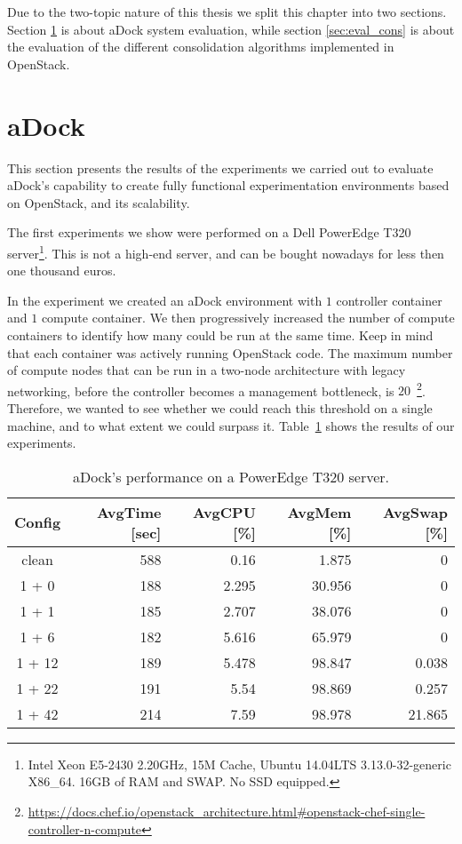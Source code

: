 
Due to the two-topic nature of this thesis we split this chapter into two sections. Section \ref{sec:eval_adock} is about aDock system evaluation, while section \ref{sec:eval_cons} is about the evaluation of the different consolidation algorithms implemented in OpenStack.

\section{aDock}
\label{sec:eval_adock}
This section presents the results of the experiments we carried out to evaluate aDock's capability to create fully functional experimentation environments based on OpenStack, and its scalability.

The first experiments we show were performed on a Dell PowerEdge T320 server\footnote{Intel Xeon E5-2430 2.20GHz, 15M Cache, Ubuntu 14.04LTS 3.13.0-32-generic X86\_64. 16GB of RAM and SWAP. No SSD equipped.}. This is not a high-end server, and can be bought nowadays for less then one thousand euros. 

In the experiment we created an aDock environment with $1$ controller container and $1$ compute container. We then progressively increased the number of compute containers to identify how many could be run at the same time. Keep in mind that each container was actively running OpenStack code. The maximum number of compute nodes that can be run in a two-node architecture with legacy networking, before the controller becomes a management bottleneck, is $20$~\footnote{\url{https://docs.chef.io/openstack_architecture.html\#openstack-chef-single-controller-n-compute}}. Therefore, we wanted to see whether we could reach this threshold on a single machine, and to what extent we could surpass it. Table~\ref{tab:adock_server} shows the results of our experiments.

\begin{table}[h!]
\centering
  \begin{tabular}{| c | r | r | r | r |}
  \hline
  \textbf{Config} & \textbf{AvgTime [sec]} & \textbf{AvgCPU [\%]} & \textbf{AvgMem [\%]} & \textbf{AvgSwap [\%]}  \\
  \hline
  clean & 588 & 0.16 & 1.875 & 0 \\
  \hline
  1 + 0 & 188 & 2.295 & 30.956 & 0 \\
  \hline
  1 + 1 & 185 & 2.707 & 38.076 & 0 \\
  \hline
  1 + 6 & 182 & 5.616 & 65.979 & 0 \\
  \hline
  1 + 12 & 189 & 5.478 & 98.847 & 0.038 \\
  \hline
  1 + 22 & 191 & 5.54 & 98.869 & 0.257 \\
  \hline
  1 + 42 & 214 & 7.59 & 98.978 & 21.865 \\
  \hline
  \end{tabular}
  \vspace{2mm}
  \caption{aDock's performance on a PowerEdge T320 server.}
  \label{tab:adock_server}
\end{table}

